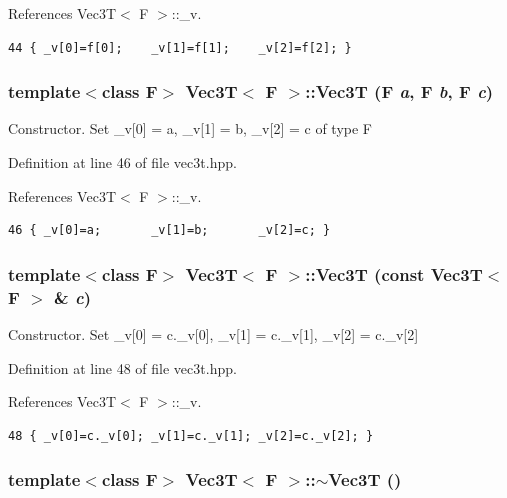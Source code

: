 References Vec3T$<$ F $>$::\_\-v.

\footnotesize\begin{verbatim}44 { _v[0]=f[0];    _v[1]=f[1];    _v[2]=f[2]; }
\end{verbatim}\normalsize 


\subsubsection{\setlength{\rightskip}{0pt plus 5cm}template$<$class F$>$ {\bf Vec3T}$<$ F $>$::{\bf Vec3T} (F {\em a}, F {\em b}, F {\em c})\hspace{0.3cm}{\tt  [inline]}}\label{classVec3T_b8c2c8fcb8fc6ddc84c8db4524380e22_b8c2c8fcb8fc6ddc84c8db4524380e22}


Constructor. Set \_\-v[0] = a, \_\-v[1] = b, \_\-v[2] = c of type F 

Definition at line 46 of file vec3t.hpp.

References Vec3T$<$ F $>$::\_\-v.

\footnotesize\begin{verbatim}46 { _v[0]=a;       _v[1]=b;       _v[2]=c; }
\end{verbatim}\normalsize 


\subsubsection{\setlength{\rightskip}{0pt plus 5cm}template$<$class F$>$ {\bf Vec3T}$<$ F $>$::{\bf Vec3T} (const {\bf Vec3T}$<$ F $>$ \& {\em c})\hspace{0.3cm}{\tt  [inline]}}\label{classVec3T_e183e9c28117743381b9299fe334b1bb_e183e9c28117743381b9299fe334b1bb}


Constructor. Set \_\-v[0] = c.\_\-v[0], \_\-v[1] = c.\_\-v[1], \_\-v[2] = c.\_\-v[2] 

Definition at line 48 of file vec3t.hpp.

References Vec3T$<$ F $>$::\_\-v.

\footnotesize\begin{verbatim}48 { _v[0]=c._v[0]; _v[1]=c._v[1]; _v[2]=c._v[2]; }
\end{verbatim}\normalsize 


\subsubsection{\setlength{\rightskip}{0pt plus 5cm}template$<$class F$>$ {\bf Vec3T}$<$ F $>$::$\sim${\bf Vec3T} ()\hspace{0.3cm}{\tt  [inline]}}\label{classVec3T_0d275e74973c4055262d8c6e03ca2f68_0d275e74973c4055262d8c6e03ca2f68}


